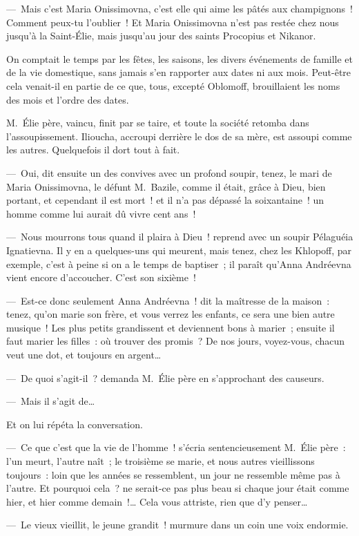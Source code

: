 \documentclass[french,twoside]{book} %
\begin{document}
— Mais c’est Maria Onissimovna, c’est elle qui aime les pâtés aux champignons ! Comment peux-tu l’oublier ! Et Maria Onissimovna n’est pas restée chez nous jusqu’à la Saint-Élie, mais jusqu’au jour des saints Procopius et Nikanor.\par
On comptait le temps par les fêtes, les saisons, les divers événements de famille et de la vie domestique, sans jamais s’en rapporter aux dates ni aux mois. Peut-être cela venait-il en partie de ce que, tous, excepté Oblomoff, brouillaient les noms des mois et l’ordre des dates.\par
M. Élie père, vaincu, finit par se taire, et toute la société retomba dans l’assoupissement. Ilioucha, accroupi derrière le dos de sa mère, est assoupi comme les autres. Quelquefois il dort tout à fait.\par
— Oui, dit ensuite un des convives avec un profond soupir, tenez, le mari de Maria Onissimovna, le défunt M. Bazile, comme il était, grâce à Dieu, bien portant, et cependant il est mort ! et il n’a pas dépassé la soixantaine ! un homme comme lui aurait dû vivre cent ans !\par
— Nous mourrons tous quand il plaira à Dieu ! reprend avec un soupir Pélaguéia Ignatievna. Il y en a quelques-uns qui meurent, mais tenez, chez les Khlopoff, par exemple, c’est à peine si on a le temps de baptiser ; il paraît qu’Anna Andréevna vient encore d’accoucher. C’est son sixième !\par
— Est-ce donc seulement Anna Andréevna ! dit la maîtresse de la maison : tenez, qu’on marie son frère, et vous verrez les enfants, ce sera une bien autre musique ! Les plus petits grandissent et deviennent bons à marier ; ensuite il faut marier les filles : où trouver des promis ? De nos jours, voyez-vous, chacun veut une dot, et toujours en argent…\par
— De quoi s’agit-il ? demanda M. Élie père en s’approchant des causeurs.\par
— Mais il s’agit de…\par
Et on lui répéta la conversation.\par
— Ce que c’est que la vie de l’homme ! s’écria sentencieusement M. Élie père : l’un meurt, l’autre naît ; le troisième se marie, et nous autres vieillissons toujours : loin que les années se ressemblent, un jour ne ressemble même pas à l’autre. Et pourquoi cela ? ne serait-ce pas plus beau si chaque jour était comme hier, et hier comme demain !… Cela vous attriste, rien que d’y penser…\par
— Le vieux vieillit, le jeune grandit ! murmure dans un coin une voix endormie.\par
\end{document}
